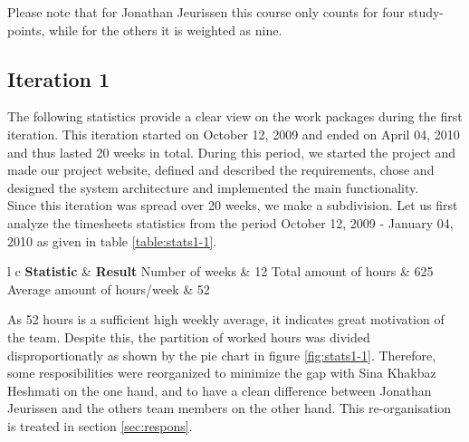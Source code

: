 \documentclass[salesmen, twoside]{../../../templates/latex/2009/softproj}
\begin{document}
\begin{projdoc}
			Please note that for Jonathan Jeurissen this course only counts for four study-points, while for the others 
			it is weighted as nine.
			
			\subsection{Iteration 1}
			
			The following statistics provide a clear view on the work packages during the first iteration. 
			This iteration started on October 12, 2009 and ended on April 04, 2010 and thus lasted 20 weeks in total. 
			During this period, we started the project and made our project website,
			defined and described the requirements, chose and designed the system architecture and 
			implemented the main functionality. \\
			
			Since this iteration was spread over 20 weeks, we make a subdivision. Let us first analyze 
			the timesheets statistics from the period October 12, 2009 - January 04, 2010 as given in
			table \ref{table:stats1-1}. \\
			
			\begin{table}
				\begin{center}
			\begin{tabular}{l c}
				\FL \textbf{Statistic} & \textbf{Result}
				\ML Number of weeks & 12
				\NN Total amount of hours  & 625
				\NN Average amount of hours/week & 52
			\end{tabular}
			\end{center}
			\caption{General statistics for period 12/10/09 - 04/01/10.}
			\label{table:stats1-1}
			\end{table}
			
			As 52 hours is a sufficient high weekly average, it indicates great motivation of the team.
			Despite this, the partition of worked hours was divided disproportionatly as shown by the pie chart in
			figure \ref{fig:stats1-1}. 
			Therefore, some resposibilities were reorganized to minimize the gap with Sina Khakbaz Heshmati
			on the one hand, 
			and to have a clean difference between Jonathan Jeurissen and the others team members on the other hand. 
			This re-organisation is treated in section \ref{sec:respons}. \\
			

\end{projdoc}
\end{document}
